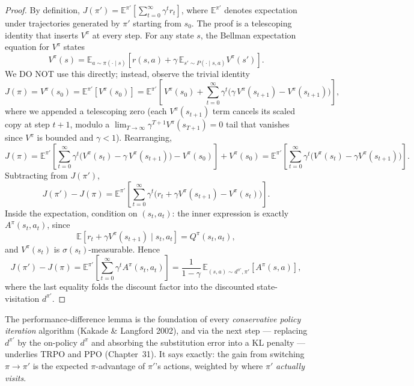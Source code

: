 \begin{proof}
By definition, $J(\pi') = \mathbb{E}^{\pi'}\!\left[\sum_{t=0}^\infty \gamma^t r_t\right]$, where $\mathbb{E}^{\pi'}$ denotes expectation under trajectories generated by $\pi'$ starting from $s_0$. The proof is a telescoping identity that inserts $V^\pi$ at every step. For any state $s$, the Bellman expectation equation for $V^\pi$ states
\[
  V^\pi(s) = \mathbb{E}_{a \sim \pi(\cdot \mid s)}\!\left[ r(s, a) + \gamma\, \mathbb{E}_{s' \sim P(\cdot \mid s, a)} V^\pi(s') \right].
\]
We DO NOT use this directly; instead, observe the trivial identity
\[
  J(\pi) = V^\pi(s_0) = \mathbb{E}^{\pi'}[V^\pi(s_0)] = \mathbb{E}^{\pi'}\!\left[\,V^\pi(s_0) + \sum_{t=0}^\infty \gamma^t \bigl(\gamma\, V^\pi(s_{t+1}) - V^\pi(s_{t+1})\bigr)\right],
\]
where we appended a telescoping zero (each $V^\pi(s_{t+1})$ term cancels its scaled copy at step $t+1$, modulo a $\lim_{T\to\infty} \gamma^{T+1} V^\pi(s_{T+1}) = 0$ tail that vanishes since $V^\pi$ is bounded and $\gamma < 1$). Rearranging,
\[
  J(\pi) = \mathbb{E}^{\pi'}\!\left[\sum_{t=0}^\infty \gamma^t \bigl(V^\pi(s_t) - \gamma\, V^\pi(s_{t+1})\bigr) - V^\pi(s_0)\right] + V^\pi(s_0) = \mathbb{E}^{\pi'}\!\left[\sum_{t=0}^\infty \gamma^t \bigl(V^\pi(s_t) - \gamma V^\pi(s_{t+1})\bigr)\right].
\]
Subtracting from $J(\pi')$,
\[
  J(\pi') - J(\pi) = \mathbb{E}^{\pi'}\!\left[\sum_{t=0}^\infty \gamma^t \bigl(r_t + \gamma V^\pi(s_{t+1}) - V^\pi(s_t)\bigr)\right].
\]
Inside the expectation, condition on $(s_t, a_t)$: the inner expression is exactly $A^\pi(s_t, a_t)$, since
\[
  \mathbb{E}\!\left[r_t + \gamma V^\pi(s_{t+1}) \mid s_t, a_t\right] = Q^\pi(s_t, a_t),
\]
and $V^\pi(s_t)$ is $\sigma(s_t)$-measurable. Hence
\[
  J(\pi') - J(\pi) = \mathbb{E}^{\pi'}\!\left[\sum_{t=0}^\infty \gamma^t A^\pi(s_t, a_t)\right] = \frac{1}{1-\gamma} \, \mathbb{E}_{(s,a) \sim d^{\pi'}, \pi'}\!\left[A^\pi(s, a)\right],
\]
where the last equality folds the discount factor into the discounted state-visitation $d^{\pi'}$. \qedhere
\end{proof}

\begin{remark}
The performance-difference lemma is the foundation of every \emph{conservative policy iteration} algorithm (Kakade \& Langford 2002), and via the next step --- replacing $d^{\pi'}$ by the on-policy $d^\pi$ and absorbing the substitution error into a KL penalty --- underlies TRPO and PPO (Chapter~31). It says exactly: the gain from switching $\pi \to \pi'$ is the expected $\pi$-advantage of $\pi'$'s actions, weighted by where $\pi'$ \emph{actually visits}.
\end{remark}

